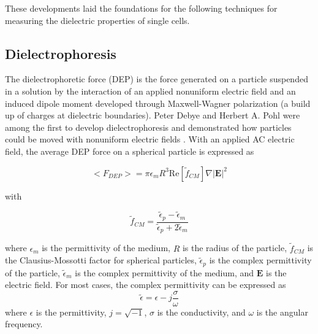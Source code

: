  
 \par These developments laid the foundations for the following techniques for measuring the dielectric properties of single cells. 
 
 \subsection{Dielectrophoresis}
 \par The dielectrophoretic force (DEP) is the force generated on a particle suspended in a solution by the interaction of an applied nonuniform electric field and an induced dipole moment developed through Maxwell-Wagner polarization (a build up of charges at dielectric boundaries). Peter Debye and Herbert A. Pohl were among the first to develop dielectrophoresis and demonstrated how particles could be moved with nonuniform electric fields \cite{muller_potential_2003}. With an applied AC electric field, the average DEP force on a spherical particle is expressed as \cite{morgan_single_2007, green_dielectrophoresis_1999}
 
 \begin{equation}
     \big< F_{DEP} \big> = \pi \epsilon_m R^3 \text{Re}[\tilde{f}_{CM}] \nabla |\textbf{E}|^2 
     \label{eqn:dep_force}
 \end{equation}
 
 \noindent with
 
 \begin{equation}
     \tilde{f}_{CM} = \frac{\tilde{\epsilon}_p - \tilde{\epsilon}_m}{\tilde{\epsilon}_p + 2\tilde{\epsilon}_m} 
     \label{eqn:fcm_background}
 \end{equation}
 
 \noindent where $\epsilon_m$ is the permittivity of the medium, $R$ is the radius of the particle, $\tilde{f}_{CM}$ is the Clausius-Mossotti factor for spherical particles,  $\tilde{\epsilon}_p$ is the complex permittivity of the particle, $\tilde{\epsilon}_m$ is the complex permittivity of the medium, and $\textbf{E}$ is the electric field. For most cases, the complex permittivity can be expressed as 
 \begin{equation}
     \tilde{\epsilon} = \epsilon - j\frac{\sigma}{\omega}
 \end{equation}
\noindent where $\epsilon$ is the permittivity, $j = \sqrt{-1}$, $\sigma$ is the conductivity, and $\omega$ is the angular frequency. 

